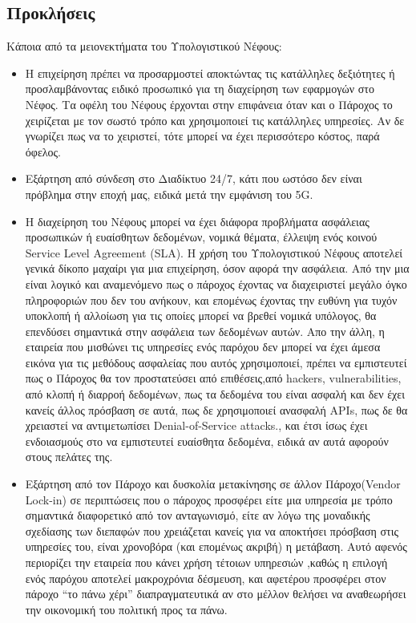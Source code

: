 \documentclass{article}
\begin{document}
\subsection{Προκλήσεις}
Κάποια από τα μειονεκτήματα του Υπολογιστικού Νέφους:
\begin{itemize}
\item	Η επιχείρηση πρέπει να προσαρμοστεί αποκτώντας τις κατάλληλες δεξιότητες ή προσλαμβάνοντας ειδικό προσωπικό για τη διαχείρηση των εφαρμογών στο Νέφος. Τα οφέλη του Νέφους έρχονται στην επιφάνεια όταν και ο Πάροχος το χειρίζεται με τον σωστό τρόπο και χρησιμοποιεί τις κατάλληλες υπηρεσίες. Αν δε γνωρίζει πως να το χειριστεί, τότε μπορεί να έχει περισσότερο κόστος, παρά όφελος.
\item	Εξάρτηση από σύνδεση στο Διαδίκτυο 24/7, κάτι που ωστόσο δεν είναι πρόβλημα στην εποχή μας, ειδικά μετά την εμφάνιση του 5G.
\item	Η διαχείρηση του Νέφους μπορεί να έχει διάφορα προβλήματα ασφάλειας προσωπικών ή ευαίσθητων δεδομένων,  νομικά θέματα, έλλειψη ενός κοινού Service Level Agreement (SLA). Η χρήση του Υπολογιστικού Νέφους αποτελεί γενικά δίκοπο μαχαίρι για μια επιχείρηση, όσον αφορά την ασφάλεια. Από την μια είναι λογικό και αναμενόμενο πως ο πάροχος έχοντας να διαχειριστεί μεγάλο όγκο πληροφοριών που δεν του ανήκουν, και επομένως έχοντας την ευθύνη για τυχόν υποκλοπή ή αλλοίωση για τις οποίες μπορεί να βρεθεί νομικά υπόλογος, θα επενδύσει σημαντικά στην ασφάλεια των δεδομένων αυτών. Απο την άλλη, η εταιρεία που μισθώνει τις υπηρεσίες ενός παρόχου δεν μπορεί  να έχει άμεσα εικόνα για τις μεθόδους ασφαλείας που αυτός χρησιμοποιεί, πρέπει να εμπιστευτεί πως ο Πάροχος θα τον προστατεύσει από επιθέσεις,από hackers, vulnerabilities, από κλοπή ή διαρροή δεδομένων, πως τα δεδομένα του είναι ασφαλή και δεν έχει κανείς άλλος πρόσβαση σε αυτά, πως δε χρησιμοποιεί ανασφαλή APIs, πως δε θα χρειαστεί να αντιμετωπίσει  Denial-of-Service attacks., και έτσι ίσως έχει ενδοιασμούς στο να εμπιστευτεί ευαίσθητα δεδομένα, ειδικά αν αυτά αφορούν στους πελάτες της.
\item	Εξάρτηση από τον Πάροχο και δυσκολία μετακίνησης σε άλλον Πάροχο(Vendor Lock-in) σε περιπτώσεις που ο πάροχος προσφέρει είτε μια υπηρεσία με τρόπο σημαντικά διαφορετικό από τον ανταγωνισμό, είτε αν λόγω της μοναδικής σχεδίασης των διεπαφών που χρειάζεται κανείς για να αποκτήσει πρόσβαση στις υπηρεσίες του, είναι χρονοβόρα (και επομένως ακριβή) η μετάβαση. Αυτό αφενός περιορίζει την εταιρεία που κάνει χρήση τέτοιων υπηρεσιών ,καθώς η επιλογή ενός παρόχου αποτελεί μακροχρόνια δέσμευση, και αφετέρου προσφέρει στον πάροχο “το πάνω χέρι” διαπραγματευτικά αν στο μέλλον θελήσει να αναθεωρήσει την οικονομική του πολιτική προς τα πάνω. 

\end{itemize}
\end{document}
